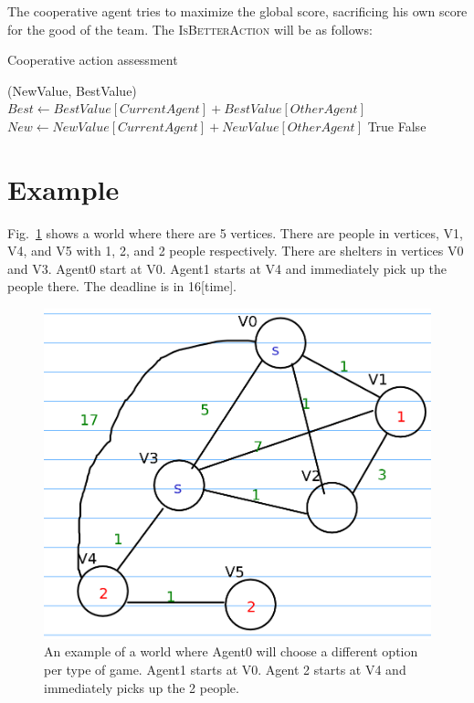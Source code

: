 \documentclass{article}                     %
\begin{document}
	The cooperative agent tries to maximize the global score, sacrificing his own score for the good of the team. 
	The \textsc{IsBetterAction} will be as follows:
	\begin{algorithm}[H]
		\label{al:semi}
		\caption{Cooperative action assessment}
		\begin{algorithmic}[1]
			(NewValue, BestValue)
			\State $ Best \leftarrow BestValue[CurrentAgent] + BestValue[OtherAgent]$
			\State $ New \leftarrow NewValue[CurrentAgent] + NewValue[OtherAgent]  $
			\State  \Return True
			\Else   \Return False
			\EndIf
			\EndProcedure
		\end{algorithmic}
	\end{algorithm}
	
	
	\section{Example}
	Fig.~\ref{fig:worlddrawing} shows a world where there are 5 vertices. There are people in vertices, V1, V4, and V5 with 1, 2, and 2 people respectively. There are shelters in vertices V0 and V3. Agent0 start at V0. Agent1 starts at V4 and immediately pick up the people there. The deadline is in 16[time].
	\begin{figure}
		\centering
		\includegraphics[width=0.5\linewidth]{world_drawing}
		\caption{An example of a world where Agent0 will choose a different option per type of game. Agent1 starts at V0. Agent 2 starts at V4 and immediately picks up the 2 people.}
		\label{fig:worlddrawing}
	\end{figure}
	
\end{document}
